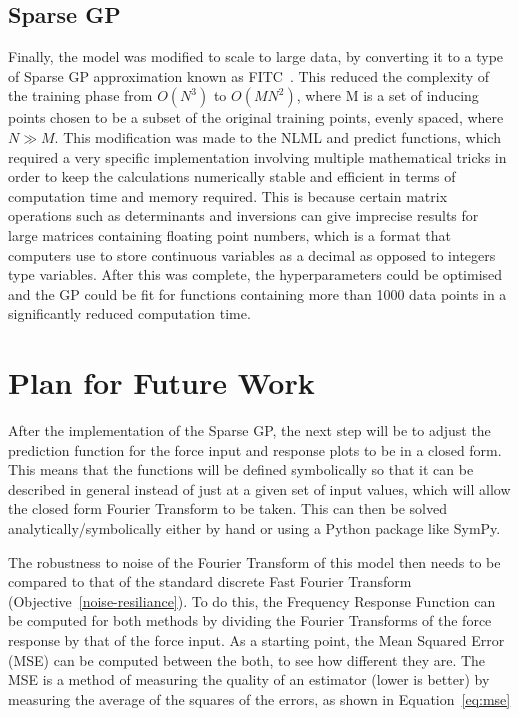 \documentclass[12pt]{article}
\begin{document}
    \subsection{Sparse GP}
    Finally, the model was modified to scale to large data, by converting it to a type of Sparse GP approximation known as FITC~\cite{q-candela}.
    This reduced the complexity of the training phase from $O(N^3)$ to $O(MN^2)$, where M is a set of inducing points chosen to be a subset of the original training points, evenly spaced, where $N \gg M$.  
    This modification was made to the NLML and predict functions, which required a very specific implementation involving multiple mathematical tricks in order to keep the calculations numerically stable and efficient in terms of computation time and memory required.
    This is because certain matrix operations such as determinants and inversions can give imprecise results for large matrices containing floating point numbers, which is a format that computers use to store continuous variables as a decimal as opposed to integers type variables.
    After this was complete, the hyperparameters could be optimised and the GP could be fit for functions containing more than 1000 data points in a significantly reduced computation time. %

    \section{Plan for Future Work}
    After the implementation of the Sparse GP, the next step will be to adjust the prediction function for the force input and response plots to be in a closed form.
    This means that the functions will be defined symbolically so that it can be described in general instead of just at a given set of input values, which will allow the closed form Fourier Transform to be taken.
    This can then be solved analytically/symbolically either by hand or using a Python package like SymPy.

    The robustness to noise of the Fourier Transform of this model then needs to be compared to that of the standard discrete Fast Fourier Transform (Objective~\ref{noise-resiliance}).
    To do this, the Frequency Response Function can be computed for both methods by dividing the Fourier Transforms of the force response by that of the force input.
    As a starting point, the Mean Squared Error (MSE) can be computed between the both, to see how different they are.
    The MSE is a method of measuring the quality of an estimator (lower is better) by measuring the average of the squares of the errors, as shown in Equation~\ref{eq:mse}
\end{document}
